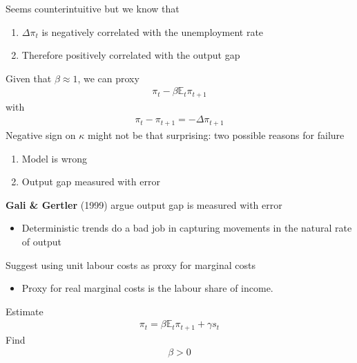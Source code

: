 \documentclass{beamer}
\begin{document}
\begin{frame}
Seems counterintuitive but we know that
\begin{enumerate}
  \item $\Delta\pi_t$ is negatively correlated with the unemployment rate
  \item Therefore positively correlated with the output gap
\end{enumerate}
\medskip
  Given that $\beta\approx1$, we can proxy
\begin{align}
  \pi_t-\beta \mathbb{E}_t\pi_{t+1}
\end{align} 
with 
\begin{align}
  \pi_t-\pi_{t+1}=-\Delta\pi_{t+1}
\end{align}
Negative sign on $\kappa$ might not be that surprising: two possible reasons for failure
\begin{enumerate}
  \item Model is wrong
  \item Output gap measured with error
\end{enumerate}
\end{frame}


\begin{frame}
  \textbf{Gali \& Gertler} (1999) argue output gap is measured with error
  \begin{itemize}
    \item Deterministic trends do a bad job in capturing movements in the natural rate of output
  \end{itemize}
  \medskip
  Suggest using unit labour costs as proxy for marginal costs
  \begin{itemize}
    \item Proxy for real marginal costs is the labour share of income.
  \end{itemize}
  Estimate 
  \begin{align}
   \pi_t = \beta \mathbb{E}_t \pi_{t+1} + \gamma s_t    
  \end{align}
  Find
  \begin{align}
    \beta>0
  \end{align} 
\end{frame}
\end{document}
